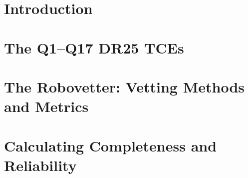 \documentclass[apj,twocolappendix,numberedappendix]{emulateapj}
\renewcommand{\_}{\discretionary{\underscore}{}{\underscore}}  %
\begin{document}
\begin{abstract}



\end{abstract}


\section{Introduction}



\section{The Q1--Q17 DR25 TCEs}
\label{tcesec}





\section{The Robovetter: Vetting Methods and Metrics}


\section{Calculating Completeness and Reliability}

\end{document}
